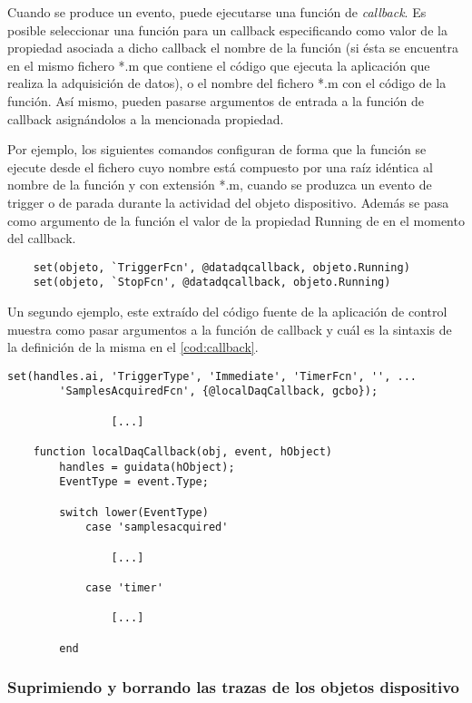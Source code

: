 Cuando se produce un evento, puede ejecutarse una función de \emph{callback}. Es posible seleccionar una función para un callback especificando como valor de la propiedad asociada a dicho callback el nombre de la función (si ésta se encuentra en el mismo fichero *.m que contiene el código que ejecuta la aplicación que realiza la adquisición de datos), o el nombre del fichero *.m con el código de la función. Así mismo, pueden pasarse argumentos de entrada a la función de callback asignándolos a la mencionada propiedad.\par
Por ejemplo, los siguientes comandos configuran  de forma que la función  se ejecute desde el fichero cuyo nombre está compuesto por una raíz idéntica al nombre de la función y con extensión *.m, cuando se produzca un evento de trigger o de parada durante la actividad del objeto dispositivo. Además se pasa como argumento de la función el valor de la propiedad \textsf{Running} de  en el momento del callback.

\begin{lstlisting}
	set(objeto, `TriggerFcn', @datadqcallback, objeto.Running)
	set(objeto, `StopFcn', @datadqcallback, objeto.Running)
\end{lstlisting}

Un segundo ejemplo, este extraído del código fuente de la aplicación de control muestra como pasar argumentos a la función de callback y cuál es la sintaxis de la definición de la misma en el \cref{cod:callback}.

\begin{lstlisting}[style=displayed, caption={[Configuración de \emph{callback}]{Configuración de \emph{callback} para responder a eventos en la sesión de muestreo, la función de \emph{callback} recibe un argumento.}}, label={cod:callback}]
	set(handles.ai, 'TriggerType', 'Immediate', 'TimerFcn', '', ...
		'SamplesAcquiredFcn', {@localDaqCallback, gcbo});

				[...]

	function localDaqCallback(obj, event, hObject)
		handles = guidata(hObject);
		EventType = event.Type;

		switch lower(EventType)
			case 'samplesacquired'

				[...]

			case 'timer'

				[...]

		end
\end{lstlisting}

\subsubsection{Suprimiendo y borrando las trazas de los objetos dispositivo}

